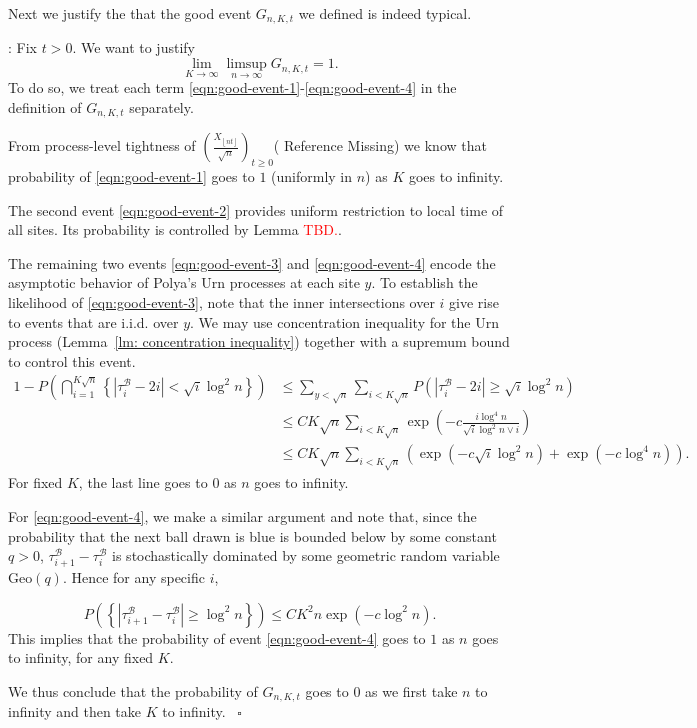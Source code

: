 \documentclass[twoside,12pt,a4paper]{article}
\numberwithin{equation}{section}
\newenvironment{proof}[1][Proof]{{\sc #1}:}{~\hfill $\square$}
\newcommand\TBD{\textcolor{red}{TBD.}}
\begin{document}
\vspace{2em}

Next we justify the that the good event $G_{n, K, t}$ we defined is indeed typical.

\begin{proof}[Proof of Lemma~\ref{lem:good-event}]
	Fix $t>0$. We want to justify
	\[
		\lim_{K\to \infty } \limsup_{n \to \infty } G_{n, K, t} = 1
	.\] 
	To do so, we treat each term \eqref{eqn:good-event-1}-\eqref{eqn:good-event-4} in the definition of $G_{n, K, t}$ separately.

	From process-level tightness of $\left( \frac{X_{\left\lfloor nt  \right\rfloor}}{\sqrt{n} } \right)_{t \ge 0} $({\color{red} Reference Missing}) we know that probability of \eqref{eqn:good-event-1} goes to $1$ (uniformly in $n$) as $K $ goes to infinity. 

	The second event \eqref{eqn:good-event-2} provides uniform restriction to local time of all sites. Its probability is controlled by Lemma \TBD.

	The remaining two events \eqref{eqn:good-event-3} and \eqref{eqn:good-event-4} encode the asymptotic behavior of Polya's Urn processes at each site $y$. To establish the likelihood of \eqref{eqn:good-event-3}, note that the inner intersections over $i$ give rise to events that are i.i.d. over $y$. We may use concentration inequality for the Urn process (Lemma~\ref{lm: concentration inequality}) together with a supremum bound to control this event.
\begin{align*}
	1-P\left(\bigcap_{i = 1}^{K \sqrt{n} } \left\{\left| \tau_i^{\mathcal{B}} - 2 i \right| < \sqrt{ i } \log^2 n \right\}
\right) 
	&\le \sum_{y < \sqrt{n} }\sum_{i < K \sqrt{ n} } P\left( |\tau_i^{\mathcal{B}} - 2i| \ge \sqrt{i} \log^2 n \right) \\
	&\le CK \sqrt{n} \sum_{i < K \sqrt{ n} } \exp\left( - c \frac{i \log^4 n}{\sqrt{i}  \log^2 n \vee i} \right)  \\
	&\le CK \sqrt{n}  \sum_{i < K \sqrt{ n} }  
	\left( \exp\left( - c \sqrt{i}  \log^2 n \right)  + 
	\exp\left( - c \log^4 n \right) \right)
.\end{align*}
For fixed $K$, the last line goes to $0$ as $n$ goes to infinity. 

For \eqref{eqn:good-event-4}, we make a similar argument and note that, since the probability that the next ball drawn is blue is bounded below by some constant $q > 0$, $\tau_{i+1}^{\mathcal{B}} - \tau_{i}^{\mathcal{B}}$ is stochastically dominated by some geometric random variable $\text{Geo}(q)$. Hence for any specific $i$,

\[
	P\left(\left\{\left| \tau_{i+1}^{\mathcal{B}} - \tau_i^{\mathcal{B}} \right| \ge  \log^2 n \right\}\right) 
	\le C K^2 n \exp\left( - c \log^2 n \right) 
.\] 
This implies that the probability of event \eqref{eqn:good-event-4} goes to $1$ as $n$ goes to infinity, for any fixed $K$.

	We thus conclude that the probability of $G_{n, K, t}$ goes to $0$ as we first take $n$ to infinity and then take $K$ to infinity.
\end{proof}
\end{document}
